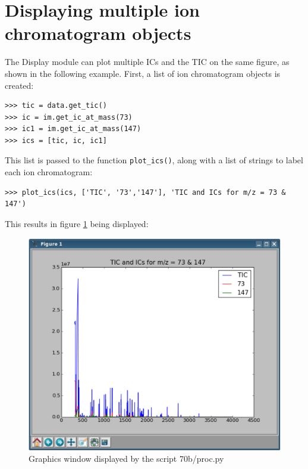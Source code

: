 \section{Displaying multiple ion chromatogram objects}


The Display module can plot multiple ICs and the TIC on the same figure,
as shown in the following example. First, a list of ion chromatogram
objects is created:

\begin{verbatim}
>>> tic = data.get_tic()
>>> ic = im.get_ic_at_mass(73)
>>> ic1 = im.get_ic_at_mass(147)
>>> ics = [tic, ic, ic1]
\end{verbatim}

This list is passed to the function {\tt plot\_ics()}, along with a list
of strings to label each ion chromatogram:

\begin{verbatim}
>>> plot_ics(ics, ['TIC', '73','147'], 'TIC and ICs for m/z = 73 & 147')
\end{verbatim}

This results in figure \ref{fig:70b} being displayed:

\begin{figure}
  \begin{center}
    \includegraphics[scale=0.33]{graphics/chapter07/test-70b.eps}
  \end{center}
  \caption{Graphics window displayed by the script 70b/proc.py}
  \label{fig:70b}
\end{figure}

